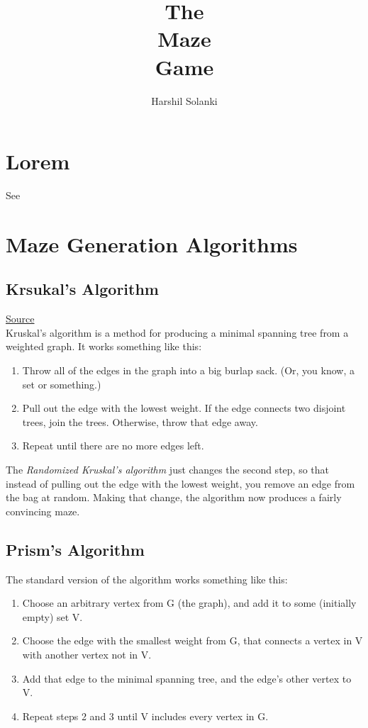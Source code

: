 \documentclass{article}
\begin{document}
\title{
The\\
Maze\\
Game\\
}
\author{Harshil Solanki}
\date{}
\maketitle
\tableofcontents
\clearpage


\section{Lorem}
See~\cite{thebook}

\section{Maze Generation Algorithms}
\subsection{Krsukal's Algorithm}
\href{https://weblog.jamisbuck.org/2011/1/3/maze-generation-kruskal-s-algorithm}{Source}\\
Kruskal's algorithm is a method for producing a minimal spanning tree from a weighted graph. It works something like this:

\begin{enumerate}
    \item Throw all of the edges in the graph into a big burlap sack. (Or, you know, a set or something.)
    \item Pull out the edge with the lowest weight. If the edge connects two disjoint trees, join the trees. Otherwise, throw that edge away.
    \item Repeat until there are no more edges left.
\end{enumerate}

The {\it Randomized Kruskal's algorithm} just changes the second step, so that instead of pulling out the edge with the lowest weight, you remove an edge from the bag at random. Making that change, the algorithm now produces a fairly convincing maze.

\subsection{Prism's Algorithm}
The standard version of the algorithm works something like this:
\begin{enumerate}
    \item Choose an arbitrary vertex from G (the graph), and add it to some (initially empty) set V.
    \item Choose the edge with the smallest weight from G, that connects a vertex in V with another vertex not in V.
    \item Add that edge to the minimal spanning tree, and the edge's other vertex to V.
    \item Repeat steps 2 and 3 until V includes every vertex in G.
\end{enumerate}
\end{document}
